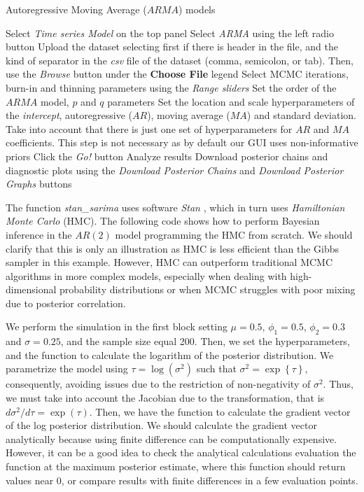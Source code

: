 \begin{algorithm}[h!]
	\caption{Autoregressive Moving Average ($ARMA$) models}\label{alg:ARMA}
	\begin{algorithmic}[1]  		 			
		\State Select \textit{Time series Model} on the top panel
		\State Select \textit{ARMA} using the left radio button
		\State Upload the dataset selecting first if there is header in the file, and the kind of separator in the \textit{csv} file of the dataset (comma, semicolon, or tab). Then, use the \textit{Browse} button under the \textbf{Choose File} legend
		\State Select MCMC iterations, burn-in and thinning parameters using the \textit{Range sliders}
		\State Set the order of the $ARMA$ model, $p$ and $q$ parameters
		\State Set the location and scale hyperparameters of the \textit{intercept}, autoregressive ($AR$), moving average ($MA$) and standard deviation. Take into account that there is just one set of hyperparameters for $AR$ and $MA$ coefficients. This step is not necessary as by default our GUI uses non-informative priors
		\State Click the \textit{Go!} button
		\State Analyze results
		\State Download posterior chains and diagnostic plots using the \textit{Download Posterior Chains} and \textit{Download Posterior Graphs} buttons
	\end{algorithmic} 
\end{algorithm}

The function \textit{stan\_sarima} uses software \textit{Stan} \cite{Stan2024}, which in turn uses \textit{Hamiltonian Monte Carlo} (HMC). The following code shows how to perform Bayesian inference in the $AR(2)$ model programming the HMC from scratch. We should clarify that this is only an illustration as HMC is less efficient than the Gibbs sampler in this example. However, HMC can outperform traditional MCMC algorithms in more complex models, especially when dealing with high-dimensional probability distributions or when MCMC struggles with poor mixing due to posterior correlation.

We perform the simulation in the first block setting $\mu=0.5$, $\phi_1=0.5$, $\phi_2=0.3$ and $\sigma=0.25$, and the sample size equal 200. Then, we set the hyperparameters, and the function to calculate the logarithm of the posterior distribution. We parametrize the model using $\tau = \log(\sigma^2)$ such that $\sigma^2=\exp\left\{\tau\right\}$, consequently, avoiding issues due to the restriction of non-negativity of $\sigma^2$. Thus, we must take into account the Jacobian due to the transformation, that is $d\sigma^2/d\tau=\exp(\tau)$. Then, we have the function to calculate the gradient vector of the log posterior distribution. We should calculate the gradient vector analytically because using finite difference can be computationally expensive. However, it can be a good idea to check the analytical calculations evaluation the function at the maximum posterior estimate, where this function should return values near 0, or compare results with finite differences in a few evaluation points.

